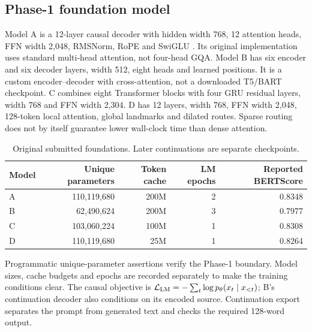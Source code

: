 \documentclass[11pt, oneside]{article}
\begin{document}
\subsection{Phase-1 foundation model}
Model A is a 12-layer causal decoder with hidden width 768, 12 attention heads,
FFN width 2,048, RMSNorm, RoPE and SwiGLU \cite{vaswani2017attention}.
Its original implementation uses standard multi-head attention, not four-head GQA.
Model B has six encoder and six decoder layers, width 512, eight heads and learned
positions. It is a custom encoder--decoder with cross-attention, not a downloaded
T5/BART checkpoint. C combines eight Transformer blocks with four GRU residual
layers, width 768 and FFN width 2,304. D has 12 layers, width 768, FFN width 2,048,
128-token local attention, global landmarks and dilated routes. Sparse routing does
not by itself guarantee lower wall-clock time than dense attention.
\begin{table}[H]\centering\small
\caption{Original submitted foundations. Later continuations are separate checkpoints.}
\begin{tabular}{lrrrr}\toprule
Model & Unique parameters & Token cache & LM epochs & Reported BERTScore\\\midrule
A & 110,119,680 & 200M & 2 & 0.8348\\
B & 62,490,624 & 200M & 3 & 0.7977\\
C & 103,060,224 & 100M & 1 & 0.8308\\
D & 110,119,680 & 25M & 1 & 0.8264\\\bottomrule
\end{tabular}\end{table}
Programmatic unique-parameter assertions verify the Phase-1 boundary. Model sizes,
cache budgets and epochs are recorded separately to make the training conditions clear.
The causal objective is $\mathcal L_{\rm LM}=-\sum_t\log p_\theta(x_t\mid x_{<t})$;
B's continuation decoder also conditions on its encoded source. Continuation export
separates the prompt from generated text and checks the required 128-word output.
\end{document}
